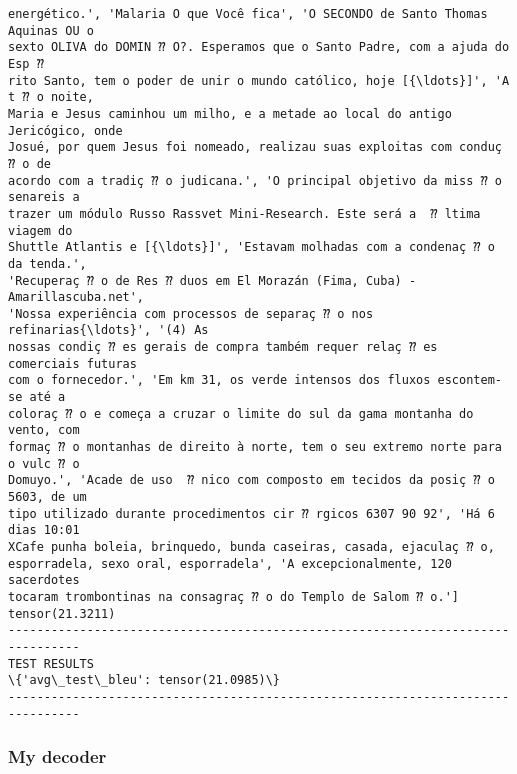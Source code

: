 \documentclass[10pt]{article}
\begin{document}
\begin{Verbatim}[commandchars=\\\{\}]
energético.', 'Malaria O que Você fica', 'O SECONDO de Santo Thomas Aquinas OU o
sexto OLIVA do DOMIN ⁇ O?. Esperamos que o Santo Padre, com a ajuda do Esp ⁇
rito Santo, tem o poder de unir o mundo católico, hoje [{\ldots}]', 'A t ⁇ o noite,
Maria e Jesus caminhou um milho, e a metade ao local do antigo Jericógico, onde
Josué, por quem Jesus foi nomeado, realizau suas exploitas com conduç ⁇ o de
acordo com a tradiç ⁇ o judicana.', 'O principal objetivo da miss ⁇ o senareis a
trazer um módulo Russo Rassvet Mini-Research. Este será a  ⁇ ltima viagem do
Shuttle Atlantis e [{\ldots}]', 'Estavam molhadas com a condenaç ⁇ o da tenda.',
'Recuperaç ⁇ o de Res ⁇ duos em El Morazán (Fima, Cuba) - Amarillascuba.net',
'Nossa experiência com processos de separaç ⁇ o nos refinarias{\ldots}', '(4) As
nossas condiç ⁇ es gerais de compra também requer relaç ⁇ es comerciais futuras
com o fornecedor.', 'Em km 31, os verde intensos dos fluxos escontem-se até a
coloraç ⁇ o e começa a cruzar o limite do sul da gama montanha do vento, com
formaç ⁇ o montanhas de direito à norte, tem o seu extremo norte para o vulc ⁇ o
Domuyo.', 'Acade de uso  ⁇ nico com composto em tecidos da posiç ⁇ o 5603, de um
tipo utilizado durante procedimentos cir ⁇ rgicos 6307 90 92', 'Há 6 dias 10:01
XCafe punha boleia, brinquedo, bunda caseiras, casada, ejaculaç ⁇ o,
esporradela, sexo oral, esporradela', 'A excepcionalmente, 120 sacerdotes
tocaram trombontinas na consagraç ⁇ o do Templo de Salom ⁇ o.']
tensor(21.3211)
--------------------------------------------------------------------------------
TEST RESULTS
\{'avg\_test\_bleu': tensor(21.0985)\}
--------------------------------------------------------------------------------

    \end{Verbatim}

    \hypertarget{my-decoder}{%
\subsubsection*{My decoder}\label{my-decoder}}
\end{document}
